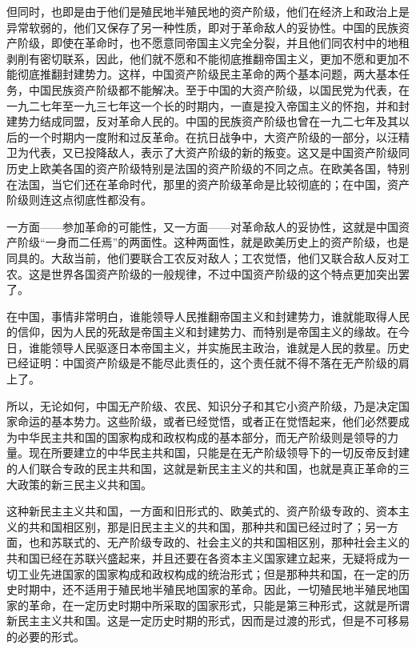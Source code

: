 但同时，也即是由于他们是殖民地半殖民地的资产阶级，他们在经济上和政治上是异常软弱的，他们又保存了另一种性质，即对于革命敌人的妥协性。中国的民族资产阶级，即使在革命时，也不愿意同帝国主义完全分裂，并且他们同农村中的地租剥削有密切联系，因此，他们就不愿和不能彻底推翻帝国主义，更加不愿和更加不能彻底推翻封建势力。这样，中国资产阶级民主革命的两个基本问题，两大基本任务，中国民族资产阶级都不能解决。至于中国的大资产阶级，以国民党为代表，在一九二七年至一九三七年这一个长的时期内，一直是投入帝国主义的怀抱，并和封建势力结成同盟，反对革命人民的。中国的民族资产阶级也曾在一九二七年及其以后的一个时期内一度附和过反革命。在抗日战争中，大资产阶级的一部分，以汪精卫为代表，又已投降敌人，表示了大资产阶级的新的叛变。这又是中国资产阶级同历史上欧美各国的资产阶级特别是法国的资产阶级的不同之点。在欧美各国，特别在法国，当它们还在革命时代，那里的资产阶级革命是比较彻底的；在中国，资产阶级则连这点彻底性都没有。

一方面——参加革命的可能性，又一方面——对革命敌人的妥协性，这就是中国资产阶级“一身而二任焉”的两面性。这种两面性，就是欧美历史上的资产阶级，也是同具的。大敌当前，他们要联合工农反对敌人；工农觉悟，他们又联合敌人反对工农。这是世界各国资产阶级的一般规律，不过中国资产阶级的这个特点更加突出罢了。

在中国，事情非常明白，谁能领导人民推翻帝国主义和封建势力，谁就能取得人民的信仰，因为人民的死敌是帝国主义和封建势力、而特别是帝国主义的缘故。在今日，谁能领导人民驱逐日本帝国主义，并实施民主政治，谁就是人民的救星。历史已经证明：中国资产阶级是不能尽此责任的，这个责任就不得不落在无产阶级的肩上了。

所以，无论如何，中国无产阶级、农民、知识分子和其它小资产阶级，乃是决定国家命运的基本势力。这些阶级，或者已经觉悟，或者正在觉悟起来，他们必然要成为中华民主共和国的国家构成和政权构成的基本部分，而无产阶级则是领导的力量。现在所要建立的中华民主共和国，只能是在无产阶级领导下的一切反帝反封建的人们联合专政的民主共和国，这就是新民主主义的共和国，也就是真正革命的三大政策的新三民主义共和国。

这种新民主主义共和国，一方面和旧形式的、欧美式的、资产阶级专政的、资本主义的共和国相区别，那是旧民主主义的共和国，那种共和国已经过时了；另一方面，也和苏联式的、无产阶级专政的、社会主义的共和国相区别，那种社会主义的共和国已经在苏联兴盛起来，并且还要在各资本主义国家建立起来，无疑将成为一切工业先进国家的国家构成和政权构成的统治形式；但是那种共和国，在一定的历史时期中，还不适用于殖民地半殖民地国家的革命。因此，一切殖民地半殖民地国家的革命，在一定历史时期中所采取的国家形式，只能是第三种形式，这就是所谓新民主主义共和国。这是一定历史时期的形式，因而是过渡的形式，但是不可移易的必要的形式。

